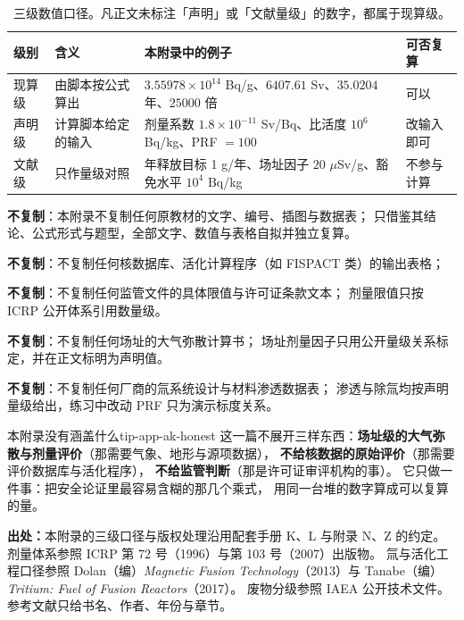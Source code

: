 \begin{table}[htbp]
\centering
\small
\caption{三级数值口径。凡正文未标注「声明」或「文献量级」的数字，都属于现算级。}
\label{tab:app-ak-source}
\begin{tabular}{p{2.3cm}p{3.5cm}p{5.2cm}p{2.6cm}}
\toprule
级别 & 含义 & 本附录中的例子 & 可否复算 \\
\midrule
现算级 & 由脚本按公式算出 & $3.55978\times10^{14}$ Bq/g、$6407.61$ Sv、$35.0204$ 年、$25000$ 倍 & 可以 \\
声明级 & 计算脚本给定的输入 & 剂量系数 $1.8\times10^{-11}$ Sv/Bq、比活度 $10^{6}$ Bq/kg、PRF $=100$ & 改输入即可 \\
文献级 & 只作量级对照 & 年释放目标 1 g/年、场址因子 $20$ $\mu$Sv/g、豁免水平 $10^{4}$ Bq/kg & 不参与计算 \\
\bottomrule
\end{tabular}

\end{table}

\textbf{不复制}：本附录不复制任何原教材的文字、编号、插图与数据表；
只借鉴其结论、公式形式与题型，全部文字、数值与表格自拟并独立复算。

\textbf{不复制}：不复制任何核数据库、活化计算程序（如 FISPACT 类）的输出表格；

\textbf{不复制}：不复制任何监管文件的具体限值与许可证条款文本；
剂量限值只按 ICRP 公开体系引用数量级。

\textbf{不复制}：不复制任何场址的大气弥散计算书；
场址剂量因子只用公开量级关系标定，并在正文标明为声明值。

\textbf{不复制}：不复制任何厂商的氚系统设计与材料渗透数据表；
渗透与除氚均按声明量级给出，练习中改动 PRF 只为演示标度关系。

\begin{tip}{本附录没有涵盖什么}{tip-app-ak-honest}
这一篇不展开三样东西：\textbf{场址级的大气弥散与剂量评价}（那需要气象、地形与源项数据），
\textbf{不给核数据的原始评价}（那需要评价数据库与活化程序），
\textbf{不给监管判断}（那是许可证审评机构的事）。
它只做一件事：把安全论证里最容易含糊的那几个乘式，
用同一台堆的数字算成可以复算的量。
\end{tip}

\textbf{出处：}本附录的三级口径与版权处理沿用配套手册 K、L 与附录 N、Z 的约定。
剂量体系参照 ICRP 第 72 号（1996）与第 103 号（2007）出版物。
氚与活化工程口径参照 Dolan（编）\emph{Magnetic Fusion Technology}（2013）与
Tanabe（编）\emph{Tritium: Fuel of Fusion Reactors}（2017）。
废物分级参照 IAEA 公开技术文件。参考文献只给书名、作者、年份与章节。
\endgroup